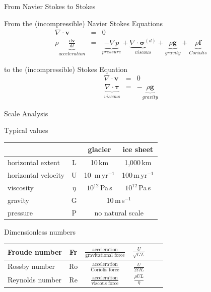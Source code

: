 \documentclass[hide notes,intlimits,unknownkeysallowed]{beamer}
\begin{document}
\begin{frame}{From Navier Stokes to Stokes}
  \begin{block}{From the (incompressible) Navier Stokes Equations}
    \begin{eqnarray}
      \nabla \cdot \bm{v} & = & 0 \\
    \rho \underbrace{\frac{\textrm{d} {\bm{v}}}{\textrm{d} t}}_{acceleration} & = & \underbrace{-\nabla p}_{pressure} +  \underbrace{\nabla \cdot \bm{\sigma}^{(d)}}_{viscous}  + \underbrace{\rho\bm{g}}_{gravity} + \underbrace{\rho\bm{f}}_{Coriolis}
  \end{eqnarray}
  \end{block}
  \begin{block}{to the (incompressible) Stokes Equation}
    \begin{eqnarray}
      \nabla \cdot \bm{v} & = & 0 \\
      \underbrace{\nabla \cdot \bm{\tau}}_{viscous} & = & - \underbrace{\rho\bm{g}}_{gravity}
    \end{eqnarray}
  \end{block}
\end{frame}

\begin{frame}{Scale Analysis}
  \begin{block}{Typical values}
    \begin{tabular}{lccc}
      & & glacier & ice sheet \\[.25em]
  \hline
  horizontal extent & L & 10\,km & 1,000\,km \\[.25em]
  \hline
  horizontal velocity & U & 10 \,m\,yr$^{-1}$ & 100\,m\,yr$^{-1}$ \\[.25em]
  \hline
  viscosity & $\eta$ & $10^{12}$\,Pa\,s & $10^{12}$\,Pa\,s \\[.25em]
  \hline
  gravity & G & \multicolumn{2}{c}{10\,m\,s$^{-1}$}\\[.25em]
  \hline
  pressure & P & \multicolumn{2}{c}{no natural scale} \\[.25em]
  \hline
\end{tabular}        
  \end{block}
  \begin{block}{Dimensionless numbers}\vspace{0.5em}
\begin{tabular}{lccccc}
\hline
Froude number & Fr & $\frac{\text{acceleration}}{\text{gravitational force}}$ & $\frac{U}{\sqrt{GL}}$ \\[.25em]
\hline
Rossby number & Ro & $\frac{\text{acceleration}}{\text{Coriolis force}}$ & $\frac{U}{2 \Omega L}$   \\[.25em]
\hline
Reynolds number & Re & $\frac{\text{acceleration}}{\text{viscous force}}$ & $\frac{\rho U L}{\eta}$ \\[.25em]
\hline
\end{tabular}        
  \end{block}
\end{frame}
\end{document}
